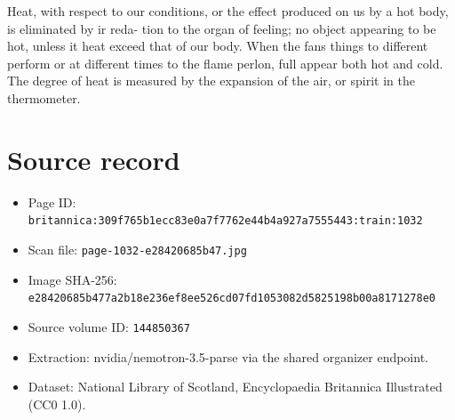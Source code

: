 \documentclass{article}
\begin{document}
Heat, with respect to our conditions, or the effect produced on us by a hot body, is eliminated by ir reda- tion to the organ of feeling; no object appearing to be hot, unless it heat exceed that of our body. When the fans things to different perform or at different times to the flame perlon, full appear both hot and cold. The degree of heat is measured by the expansion of the air, or spirit in the thermometer.

\section*{Source record}
\begin{itemize}
\item Page ID: \texttt{britannica:309f765b1ecc83e0a7f7762e44b4a927a7555443:train:1032}
\item Scan file: \texttt{page-1032-e28420685b47.jpg}
\item Image SHA-256: \texttt{e28420685b477a2b18e236ef8ee526cd07fd1053082d5825198b00a8171278e0}
\item Source volume ID: \texttt{144850367}
\item Extraction: nvidia/nemotron-3.5-parse via the shared organizer endpoint.
\item Dataset: National Library of Scotland, Encyclopaedia Britannica Illustrated (CC0 1.0).
\end{itemize}
\end{document}

